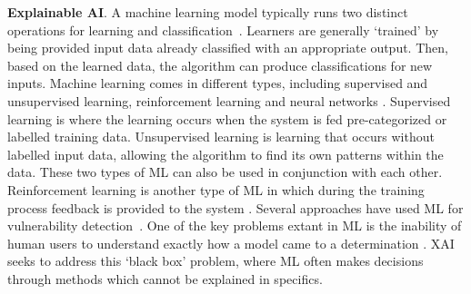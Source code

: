 




{\bf Explainable AI}. A machine learning model typically runs
two distinct operations for learning and
classification~\cite{B16,DBLP:conf/icml/MengBK20,DBLP:conf/icml/MukherjeeYBS20,DBLP:conf/icml/NockM20}. Learners
are generally `trained' by being provided input data already
classified with an appropriate output. Then, based on the learned
data, the algorithm can produce classifications for new
inputs. Machine learning comes in different types, including
supervised and unsupervised learning, reinforcement learning and
neural networks
\cite{DBLP:journals/csur/MayerJ20,DBLP:journals/csur/VerbraekenWKKVR20,DBLP:journals/csur/ChenZZ0S020,DBLP:journals/csur/QianSWJLGPJYZRW20,DBLP:journals/csur/GuoCLH020,DBLP:journals/csur/LeCB20,DBLP:journals/comsur/OlowononiRL21}. Supervised
learning is where the learning occurs when the system is fed
pre-categorized or labelled training data. Unsupervised learning is
learning that occurs without labelled input data, allowing the
algorithm to find its own patterns within the data. These two types of
ML can also be used in conjunction with each other. Reinforcement
learning is another type of ML in which during the training process
feedback is provided to the system
\cite{DBLP:conf/icml/AgarwalS020,DBLP:conf/icml/0003KWGL20,DBLP:journals/comsur/LeiTZLZS20,DBLP:journals/csur/MendoncaZB19}. Several
approaches have used ML for vulnerability
detection~\cite{li2018vuldeepecker,zhou2019devign,li2018sysevr,russell2018automated,chakraborty2020deep}. One
of the key problems extant in ML is the inability of human users to
understand exactly how a model came to a determination
\cite{DBLP:journals/comsur/LeiTZLZS20}. XAI seeks to address this
`black box' problem, where ML often makes decisions through
methods which cannot be explained in specifics.

